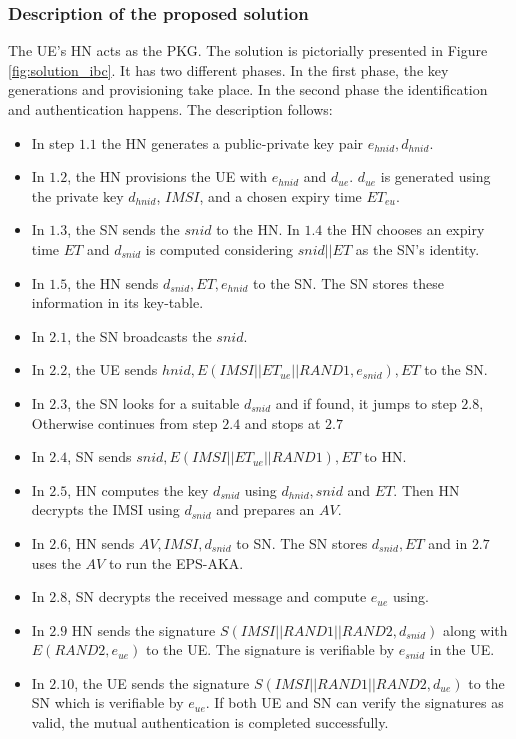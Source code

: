 \documentclass{llncs} %
\begin{document}
\subsubsection{Description of the proposed solution}
The UE's HN acts as the PKG. The solution is pictorially presented in Figure \ref{fig:solution_ibc}. It has two different phases. In the first phase, the key generations and provisioning take place. In the second phase the identification and authentication happens. The description follows:

\begin{itemize}
\item In step $1.1$ the HN generates a public-private key pair $e_{hnid},d_{hnid}$.
\item In $1.2$, the HN provisions the UE with $e_{hnid}$ and $d_{ue}$. $d_{ue}$ is generated using the private key $d_{hnid}$, $IMSI$, and a chosen expiry time $ET_{eu}$. 
\item In  $1.3$, the SN sends the $snid$ to the HN. In  $1.4$ the HN chooses an expiry time $ET$ and $d_{snid}$ is computed considering $snid||ET$ as the SN's identity. 
\item In  $1.5$, the HN sends $d_{snid},ET,e_{hnid}$ to the SN. The SN stores these information in its key-table. 
\item In  $2.1$, the SN broadcasts the $snid$. 
\item In  $2.2$, the UE sends $hnid,E(IMSI||ET_{ue}||RAND1,e_{snid}),ET$ to the SN. 
\item In  $2.3$, the SN looks for a suitable $d_{snid}$ and if found, it jumps to step $2.8$, Otherwise continues from step $2.4$ and stops at $2.7$
\item In $2.4$, SN sends $snid,E(IMSI||ET_{ue}||RAND1),ET$ to HN. 
\item In $2.5$, HN computes the key $d_{snid}$ using $d_{hnid},snid$ and $ET$. Then HN decrypts the IMSI using $d_{snid}$ and  prepares an $AV$.
\item In $2.6$, HN sends  $AV,IMSI,d_{snid}$ to SN. The SN stores $d_{snid},ET$ and in $2.7$ uses the $AV$ to run the EPS-AKA.
\item In $2.8$, SN decrypts the received message and compute $e_{ue}$ using. 
\item In $2.9$ HN sends the signature $S(IMSI||RAND1||RAND2,d_{snid})$ along with $E(RAND2,e_{ue})$ to the UE. The signature is verifiable by $e_{snid}$ in the UE. 
\item In $2.10$, the UE sends the signature $S(IMSI||RAND1||RAND2,d_{ue})$ to the SN which is verifiable by $e_{ue}$. If both UE and SN can verify the signatures as valid, the mutual authentication is completed successfully.
\end{itemize}
\end{document}
